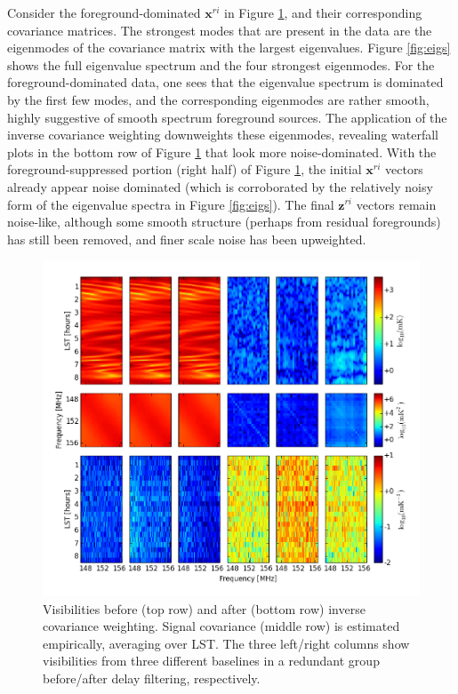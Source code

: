 \documentclass[twocolumn,numberedappendix]{emulateapj} \shorttitle{New Limits on the 21 cm Power Spectrum at $z=8.4$}
\begin{document}
Consider the foreground-dominated $\mathbf{x}^{ri}$ in Figure \ref{fig:inv_cov}, and
their corresponding covariance matrices. The strongest modes that are present in the
data are the eigenmodes of the covariance matrix with the largest eigenvalues. Figure
\ref{fig:eigs} shows the full eigenvalue spectrum and the four strongest eigenmodes.
For the foreground-dominated data, one sees that the eigenvalue spectrum is dominated
by the first few modes, and the corresponding eigenmodes are rather smooth, highly suggestive
of smooth spectrum foreground sources. The application of the inverse covariance weighting
downweights these eigenmodes, revealing waterfall plots in the bottom row of Figure \ref{fig:inv_cov}
that look more noise-dominated. With the foreground-suppressed portion (right half) of Figure \ref{fig:inv_cov},
the initial $\mathbf{x}^{ri}$ vectors already appear noise dominated (which is corroborated by the
relatively noisy form of the eigenvalue spectra in Figure \ref{fig:eigs}). The final $\mathbf{z}^{ri}$ vectors
remain noise-like, although some smooth structure (perhaps from residual foregrounds) has still been removed, and finer scale noise
has been upweighted.

\begin{figure}\centering
\includegraphics[width=2\columnwidth]{plots/inv_cov.png}
\caption{
Visibilities before (top row) and after (bottom row) inverse covariance weighting.
Signal covariance (middle row) is estimated empirically, averaging over LST.
The three left/right columns show visibilities from
three different baselines in a redundant group before/after delay filtering, respectively.
} \label{fig:inv_cov}
\end{figure}
\end{document}
